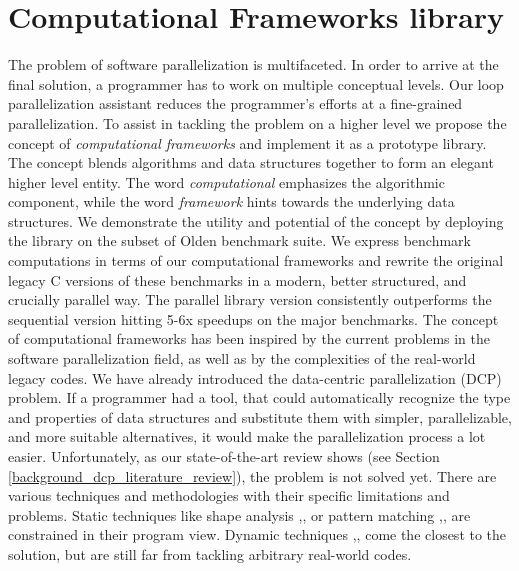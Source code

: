 \section{Computational Frameworks library}
\label{introduction_frameworks}
\quad The problem of software parallelization is multifaceted. In order to arrive at the final solution, a programmer has to work on multiple conceptual levels. Our loop parallelization assistant reduces the programmer's efforts at a fine-grained parallelization. To assist in tackling the problem on a higher level we propose the concept of \textit{computational frameworks} and implement it as a prototype library. The concept blends algorithms and data structures together to form an elegant higher level entity. The word \textit{computational} emphasizes the algorithmic component, while the word \textit{framework} hints towards the underlying data structures. We demonstrate the utility and potential of the concept by deploying the library on the subset of Olden benchmark suite. We express benchmark computations in terms of our computational frameworks and rewrite the original legacy C versions of these benchmarks in a modern, better structured, and crucially parallel way. The parallel library version consistently outperforms the sequential version hitting 5-6x speedups on the major benchmarks.\newline\null
\quad The concept of computational frameworks has been inspired by the current problems in the software parallelization field, as well as by the complexities of the real-world legacy codes. We have already introduced the data-centric parallelization (DCP) problem. If a programmer had a tool, that could automatically recognize the type and properties of data structures and substitute them with simpler, parallelizable, and more suitable alternatives, it would make the parallelization process a lot easier. Unfortunately, as our state-of-the-art review shows (see Section \ref{background_dcp_literature_review}), the problem is not solved yet. There are various techniques and methodologies with their specific limitations and problems. Static techniques like shape analysis \cite{Ghiya:1996:TDC:237721.237724},\cite{Sagiv:1999:PSA:292540.292552},\cite{Wilhelm:2000:SA:647476.760384} or pattern matching \cite{Ginsbach:2017:DEG:3049832.3049862},\cite{Ginsbach:2018:CDS:3178372.3179515},\cite{Ginsbach:2018:AML:3296957.3173182} are constrained in their program view. Dynamic techniques \cite{1669122},\cite{Haller:2016:SDS:2938006.2938029},\cite{Rupprecht:2017:DID:3155562.3155607} come the closest to the solution, but are still far from tackling arbitrary real-world codes.\newline\null
